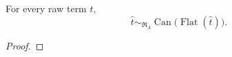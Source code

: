 \begin{lemma}
\label{lemma:lambda-graphical-normal-form}
For every raw term $t$,
\[
  \widehat t
  \sim_{\mathfrak R_{\Lambda}}
  \operatorname{Can}
  \bigl(\operatorname{Flat}(\widehat t)\bigr).
\]
\end{lemma}
\begin{proof}




\end{proof}
